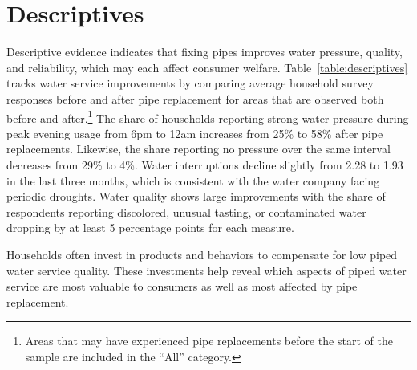 \documentclass[12pt,table]{article}
\begin{document}



\section{Descriptives}\label{section:descriptives}

Descriptive evidence indicates that fixing pipes improves water pressure, quality, and reliability, which may each affect consumer welfare.  Table~\ref{table:descriptives} tracks water service improvements by comparing average household survey responses before and after pipe replacement for areas that are observed both before and after.\footnote{Areas that may have experienced pipe replacements before the start of the sample are included in the ``All'' category.}  The share of households reporting strong water pressure during peak evening usage from 6pm to 12am increases from 25\% to 58\% after pipe replacements.  Likewise, the share reporting no pressure over the same interval decreases from 29\% to 4\%.  Water interruptions decline slightly from 2.28 to 1.93 in the last three months, which is consistent with the water company facing periodic droughts.  Water quality shows large improvements with the share of respondents reporting discolored, unusual tasting, or contaminated water dropping by at least 5 percentage points for each measure.  

Households often invest in products and behaviors to compensate for low piped water service quality.  These investments help reveal which aspects of piped water service are most valuable to consumers as well as most affected by pipe replacement.  
\end{document}
